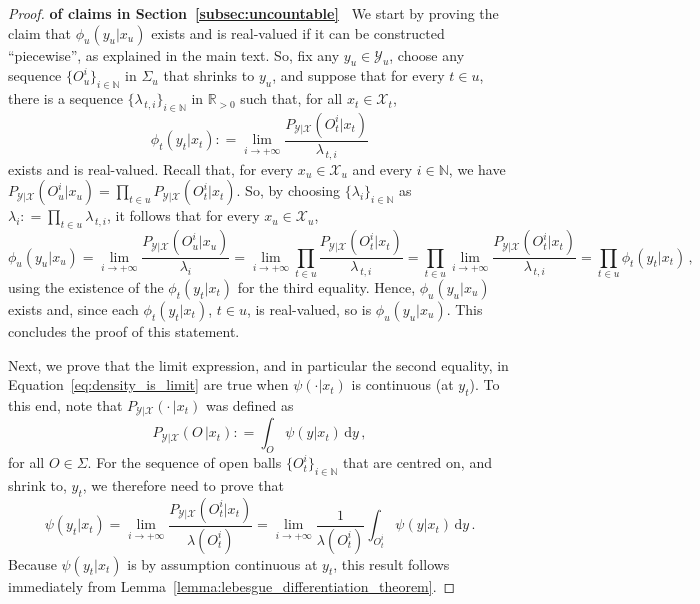 \documentclass[twoside,11pt]{article}
\newcommand{\nats}{\mathbb{N}}
\newcommand{\reals}{\mathbb{R}}
\newcommand{\realspos}{\reals_{>0}}
\newcommand{\states}{\mathcal{X}}
\newcommand{\observs}{\mathcal{Y}}
\newcommand{\coloneqq}{:\!=}
\begin{document}
\begin{proof}{\bf of claims in Section~\ref{subsec:uncountable}~}
We start by proving the claim that $\phi_u(y_u\vert x_u)$ exists and is real-valued if it can be constructed ``piecewise'', as explained in the main text. So, fix any $y_u\in\observs_u$, choose any sequence $\{O_u^i\}_{i\in\nats}$ in $\Sigma_u$  that shrinks to $y_u$, and suppose that for every $t\in u$, there is a sequence $\{\lambda_{\,t,i}\}_{i\in\nats}$ in $\realspos$ such that, for all $x_t\in\states_t$,
\begin{equation*}
\phi_t(y_t\vert x_t) \coloneqq \lim_{i\to+\infty} \frac{P_{\observs\vert\states}(O_t^i\vert x_t)}{\lambda_{\,t,i}}
\end{equation*}
exists and is real-valued. Recall that, for every $x_u\in\states_u$ and every $i\in\nats$, we have $P_{\observs\vert\states}(O_u^i\vert x_u)=\prod_{t\in u}P_{\observs\vert\states}(O_t^i\vert x_t)$. So, by choosing $\{\lambda_i\}_{i\in\nats}$ as $\lambda_i\coloneqq \prod_{t\in u}\lambda_{\,t,i}$, it follows that for every $x_u\in\states_u$,
\begin{equation*}
\phi_u(y_u\vert x_u) = \lim_{i\to+\infty} \frac{P_{\observs\vert\states}(O_u^i\vert x_u)}{\lambda_i} = \lim_{i\to+\infty} \prod_{t\in u}\frac{P_{\observs\vert\states}(O_t^i\vert x_t)}{\lambda_{\,t,i}} = \prod_{t\in u}\lim_{i\to+\infty} \frac{P_{\observs\vert\states}(O_t^i\vert x_t)}{\lambda_{\,t,i}} = \prod_{t\in u} \phi_t(y_t\vert x_t)\,,
\end{equation*}
using the existence of the $\phi_t(y_t\vert x_t)$ for the third equality. Hence, $\phi_u(y_u\vert x_u)$ exists and, since each $\phi_t(y_t\vert x_t)$, $t\in u$, is real-valued, so is $\phi_u(y_u\vert x_u)$. This concludes the proof of this statement.

Next, we prove that the limit expression, and in particular the second equality, in Equation~\eqref{eq:density_is_limit} are true when $\psi(\cdot\vert x_t)$ is continuous (at $y_t$). To this end, note that $P_{\observs\vert\states}(\cdot\,\vert x_t)$ was defined as
\begin{equation*}
P_{\observs\vert\states}(O\,\vert x_t) \coloneqq \int_O \psi(y\vert x_t)\,\mathrm{d}y\,,
\end{equation*}
for all $O\in\Sigma$. For the sequence of open balls $\{O_t^i\}_{i\in\nats}$ that are centred on, and shrink to, $y_t$, we therefore need to prove that
\begin{equation*}
\psi(y_t\vert x_t) = \lim_{i\to+\infty}\frac{P_{\observs\vert\states}(O_t^i\vert x_t)}{\lambda(O_t^i)} = \lim_{i\to+\infty}\frac{1}{\lambda(O_t^i)}\int_{O_t^i}\psi(y\vert x_t)\,\mathrm{d} y\,.
\end{equation*}
Because $\psi(y_t\vert x_t)$ is by assumption continuous at $y_t$, this result follows immediately from Lemma~\ref{lemma:lebesgue_differentiation_theorem}.


\end{proof}
\end{document}
